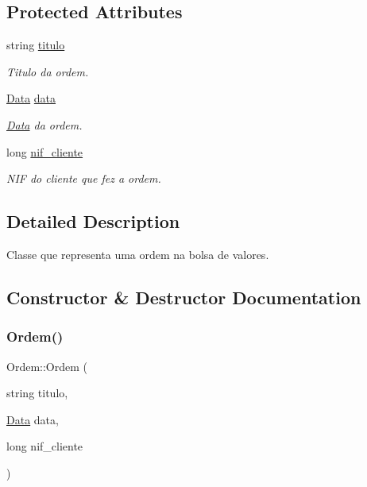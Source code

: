 \subsection*{Protected Attributes}
\begin{DoxyCompactItemize}
\item 
string \hyperlink{class_ordem_a0773861bd9fb956d5ec62f2ef1de658b}{titulo}
\begin{DoxyCompactList}\small\item\em Titulo da ordem. \end{DoxyCompactList}\item 
\hyperlink{class_data}{Data} \hyperlink{class_ordem_a9f4dbc2966e98dcbd7e300ae346d8535}{data}
\begin{DoxyCompactList}\small\item\em \hyperlink{class_data}{Data} da ordem. \end{DoxyCompactList}\item 
long \hyperlink{class_ordem_af6d06b4250735ae531bdcef5fa332f02}{nif\+\_\+cliente}
\begin{DoxyCompactList}\small\item\em N\+IF do cliente que fez a ordem. \end{DoxyCompactList}\end{DoxyCompactItemize}


\subsection{Detailed Description}
Classe que representa uma ordem na bolsa de valores. 

\subsection{Constructor \& Destructor Documentation}
\hypertarget{class_ordem_af1b393aaaec4108c394ee099b8230a10}{}\label{class_ordem_af1b393aaaec4108c394ee099b8230a10} 
\subsubsection{\texorpdfstring{Ordem()}{Ordem()}}
{\footnotesize\ttfamily Ordem\+::\+Ordem (\begin{DoxyParamCaption}\item[{string}]{titulo,  }\item[{\hyperlink{class_data}{Data}}]{data,  }\item[{long}]{nif\+\_\+cliente }\end{DoxyParamCaption})}



